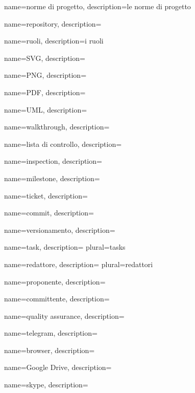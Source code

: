  {
	name=norme di progetto,
	description={le norme di progetto \TODO{}}
}

 {
	name=repository,
	description={\TODO{}}
}

 {
	name=ruoli,
	description={i ruoli\TODO{}}
}

 {
	name=SVG,
	description={\TODO{}}
}

 {
	name=PNG,
	description={\TODO{}}
}

 {
	name=PDF,
	description={\TODO{}}
}

 {
	name=UML,
	description={\TODO{}}
}

 {
	name=walkthrough,
	description={\TODO{}}
}

 {
	name=lista di controllo,
	description={\TODO{}}
}

 {
	name=inspection,
	description={\TODO{}}
}

 {
	name=milestone,
	description={\TODO{}}
}

 {
	name=ticket,
	description={\TODO{}}
}

 {
	name=commit,
	description={\TODO{}}
}

 {
	name=versionamento,
	description={\TODO{}}
}

 {
	name=task,
	description={\TODO{}}
	plural=tasks
}

 {
	name=redattore,
	description={\TODO{}}
	plural=redattori
}

 {
	name=proponente,
	description={\TODO{}}
}

 {
	name=committente,
	description={\TODO{}}
}

 {
	name=quality assurance,
	description={\TODO{}}
}

 {
	name=telegram,
	description={\TODO{}}
}

 {
	name=browser,
	description={\TODO{}}
}

 {
	name=Google Drive,
	description={\TODO{}}
}

 {
	name=skype,
	description={\TODO{}}
}

